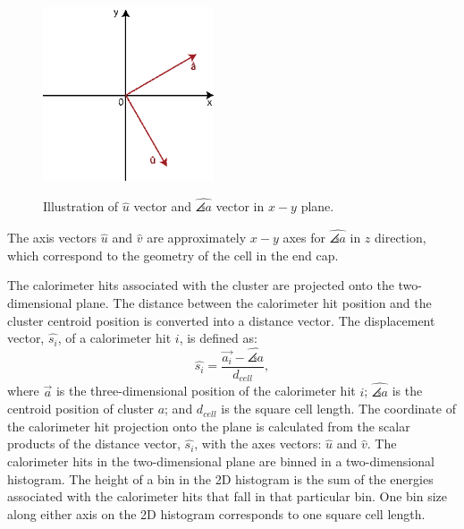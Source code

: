 \begin{figure}[tbph]
\centering
{\includegraphics[width=0.45\textwidth]{photon/uv}}
\caption[Flow chart for \peakFinding algorithm neutral cluster variant.]
{Illustration of $\hat{u}$ vector and $\hat{\angles{a}}$ vector in $x-y$ plane.}
\label{fig:photonUV}
\end{figure}

The axis vectors $\hat{u}$ and $\hat{v}$ are approximately $x-y$ axes for $\hat{\angles{a}}$ in $z$ direction, which correspond to the geometry of the \ECAL cell in the end cap.





The calorimeter hits associated with the cluster are projected onto the two-dimensional plane.  The distance between the calorimeter hit position and the cluster centroid position is converted into a distance vector. The displacement vector, $\hat{s_{i}}$, of a calorimeter hit $i$, is defined as:
\begin{equation}
\hat{s_{i}} = \frac{\vec{a_{i}} -  \hat{\angles{a}}}{d_{cell}},
\end{equation}
where $\vec{a}$ is the three-dimensional position of the calorimeter hit $i$;  $\hat{\angles{a}}$ is the centroid position of cluster $a$; and $d_{cell}$ is the  \ECAL square cell length. The coordinate of the calorimeter hit projection onto the plane is calculated from the scalar products of the distance vector, $\hat{s_{i}}$, with the axes vectors: $\hat{u}$ and $\hat{v}$.
The calorimeter hits in the two-dimensional plane are binned in a two-dimensional histogram. The height of a bin in the 2D histogram is the sum of the energies associated with the calorimeter hits that fall in that particular bin. One bin size along either axis on the 2D histogram corresponds to one \ECAL square cell length.

